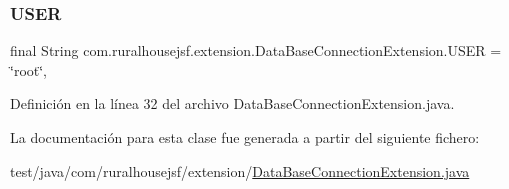 \subsubsection{\texorpdfstring{USER}{USER}}
{\footnotesize\ttfamily final String com.\+ruralhousejsf.\+extension.\+Data\+Base\+Connection\+Extension.\+U\+S\+ER = \char`\"{}root\char`\"{}\hspace{0.3cm}{\ttfamily [static]}, {\ttfamily [private]}}



Definición en la línea 32 del archivo Data\+Base\+Connection\+Extension.\+java.



La documentación para esta clase fue generada a partir del siguiente fichero\+:\begin{DoxyCompactItemize}
\item 
test/java/com/ruralhousejsf/extension/\mbox{\hyperlink{_data_base_connection_extension_8java}{Data\+Base\+Connection\+Extension.\+java}}\end{DoxyCompactItemize}
